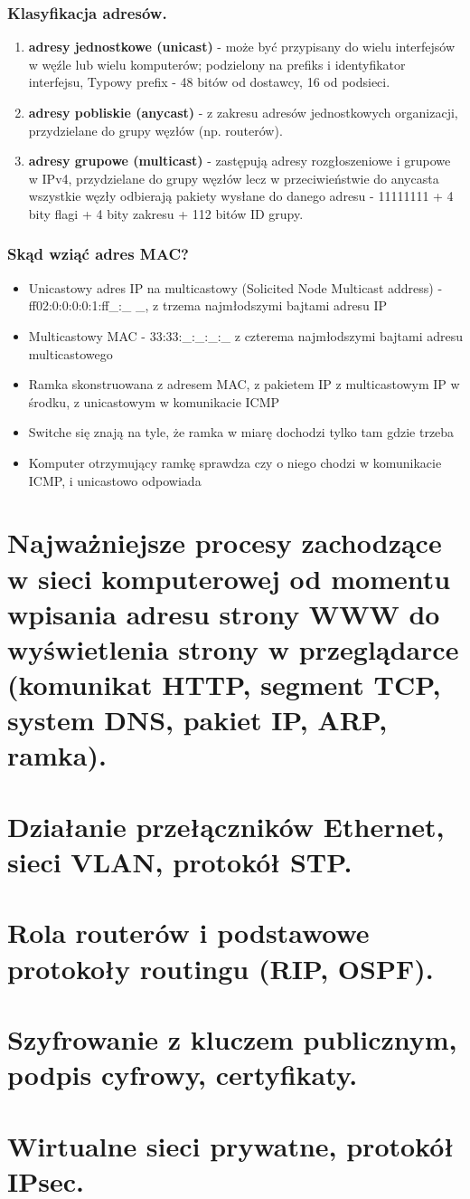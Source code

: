 \documentclass[12pt]{article}
\begin{document}
    \subsubsection{Klasyfikacja adresów.}
    \begin{enumerate}
        \item \textbf{adresy jednostkowe (unicast)} - może być przypisany do wielu interfejsów w węźle lub wielu komputerów;
        podzielony na prefiks i identyfikator interfejsu, Typowy prefix - 48 bitów od dostawcy, 16 od podsieci.
        \item \textbf{adresy pobliskie (anycast)} - z zakresu adresów jednostkowych organizacji, przydzielane do grupy
        węzłów (np. routerów).
        \item \textbf{adresy grupowe (multicast)} - zastępują adresy rozgłoszeniowe i grupowe w IPv4, przydzielane do
        grupy węzłów lecz w przeciwieństwie do anycasta wszystkie węzły odbierają pakiety wysłane do danego adresu
        - 11111111 + 4 bity flagi + 4 bity zakresu + 112 bitów ID grupy.
    \end{enumerate}

    \subsubsection{Skąd wziąć adres MAC?}
    \begin{itemize}
        \item Unicastowy adres IP na multicastowy (Solicited Node Multicast address) - ff02:0:0:0:0:1:ff\_:\_ \_,
        z trzema najmłodszymi bajtami adresu IP
        \item Multicastowy MAC - 33:33:\_:\_:\_:\_ z czterema najmłodszymi bajtami adresu multicastowego
        \item Ramka skonstruowana z adresem MAC, z pakietem IP z multicastowym IP w środku, z unicastowym w komunikacie ICMP
        \item Switche się znają na tyle, że ramka w miarę dochodzi tylko tam gdzie trzeba
        \item Komputer otrzymujący ramkę sprawdza czy o niego chodzi w komunikacie ICMP, i unicastowo odpowiada
    \end{itemize}
    \newpage

    \section{Najważniejsze procesy zachodzące w sieci komputerowej od momentu wpisania adresu strony WWW do wyświetlenia strony w przeglądarce (komunikat HTTP, segment TCP, system DNS, pakiet IP, ARP, ramka).}
    \section{Działanie przełączników Ethernet, sieci VLAN, protokół STP.}
    \section{Rola routerów i podstawowe protokoły routingu (RIP, OSPF).}
    \section{Szyfrowanie z kluczem publicznym, podpis cyfrowy, certyfikaty.}
    \section{Wirtualne sieci prywatne, protokół IPsec.}
\end{document}
